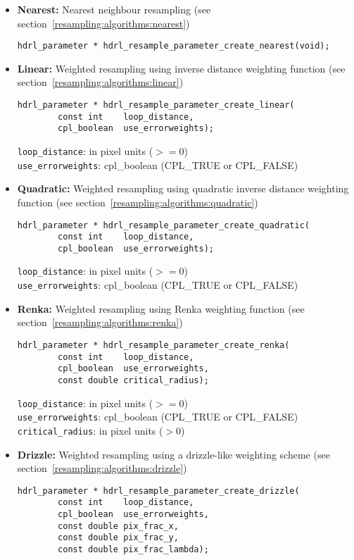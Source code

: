 \begin{itemize}

\item {\bf Nearest:} Nearest neighbour resampling (see
section~\ref{resampling:algorithms:nearest}) 
\begin{lstlisting}
hdrl_parameter * hdrl_resample_parameter_create_nearest(void);
\end{lstlisting}

\item {\bf Linear:} Weighted resampling using inverse distance weighting
function (see section~\ref{resampling:algorithms:linear})
\begin{lstlisting}
hdrl_parameter * hdrl_resample_parameter_create_linear(
        const int    loop_distance,
        cpl_boolean  use_errorweights);  
\end{lstlisting}

\verb+loop_distance+: in pixel units ($>= 0$) \\ 
\verb+use_errorweights+: cpl\_boolean (CPL\_TRUE or CPL\_FALSE)  

\item {\bf Quadratic:} Weighted resampling using quadratic inverse distance
        weighting function (see section~\ref{resampling:algorithms:quadratic})
\begin{lstlisting}
hdrl_parameter * hdrl_resample_parameter_create_quadratic(
        const int    loop_distance,
        cpl_boolean  use_errorweights);  
\end{lstlisting}

\verb+loop_distance+: in pixel units ($>= 0$) \\ 
\verb+use_errorweights+: cpl\_boolean (CPL\_TRUE or CPL\_FALSE)  

\item {\bf Renka:} Weighted resampling using Renka weighting function (see
        section~\ref{resampling:algorithms:renka}) 
\begin{lstlisting}
hdrl_parameter * hdrl_resample_parameter_create_renka(
        const int    loop_distance,
        cpl_boolean  use_errorweights,
        const double critical_radius);  
\end{lstlisting}

\verb+loop_distance+: in pixel units ($>= 0$) \\ 
\verb+use_errorweights+: cpl\_boolean (CPL\_TRUE or CPL\_FALSE)\\  
\verb+critical_radius+: in pixel units ($> 0$) 

\item {\bf Drizzle:} Weighted resampling using a drizzle-like weighting scheme
        (see section~\ref{resampling:algorithms:drizzle}) 
\begin{lstlisting}
hdrl_parameter * hdrl_resample_parameter_create_drizzle(
        const int    loop_distance,
        cpl_boolean  use_errorweights,
        const double pix_frac_x,
        const double pix_frac_y,
        const double pix_frac_lambda);
  

\end{lstlisting}
\end{itemize}
